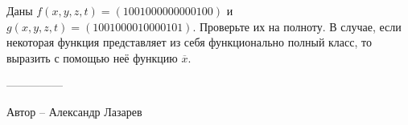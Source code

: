 \question
Даны $f(x, y, z, t) = (1001000000000100)$ и $g(x, y, z, t) = (1001000010000101)$. Проверьте их на полноту. В случае, если некоторая функция представляет из себя функционально полный класс, то выразить с помощью неё функцию  $\overline{x}$.

---------------

Автор -- Александр Лазарев